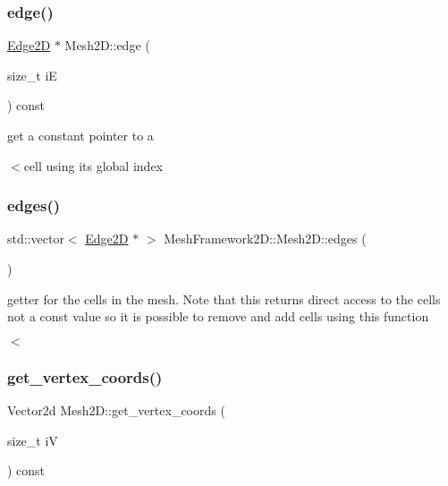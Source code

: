 \subsubsection{\texorpdfstring{edge()}{edge()}}
{\footnotesize\ttfamily \hyperlink{classMeshFramework2D_1_1Edge2D}{Edge2D} $\ast$ Mesh2\+D\+::edge (\begin{DoxyParamCaption}\item[{size\+\_\+t}]{iE }\end{DoxyParamCaption}) const}



get a constant pointer to a 

$<$cell using its global index \mbox{\label{classMeshFramework2D_1_1Mesh2D_a63b60ba84e079a7982b82b18ce5192f5}} 
\subsubsection{\texorpdfstring{edges()}{edges()}}
{\footnotesize\ttfamily std\+::vector$<$ \hyperlink{classMeshFramework2D_1_1Edge2D}{Edge2D} $\ast$ $>$ Mesh\+Framework2\+D\+::\+Mesh2\+D\+::edges (\begin{DoxyParamCaption}{ }\end{DoxyParamCaption})\hspace{0.3cm}{\ttfamily [inline]}}



getter for the cells in the mesh. Note that this returns direct access to the cells not a const value so it is possible to remove and add cells using this function 

$<$ \mbox{\label{classMeshFramework2D_1_1Mesh2D_a66b317b0a3cfba8a1935928db560957f}} 
\subsubsection{\texorpdfstring{get\+\_\+vertex\+\_\+coords()}{get\_vertex\_coords()}}
{\footnotesize\ttfamily Vector2d Mesh2\+D\+::get\+\_\+vertex\+\_\+coords (\begin{DoxyParamCaption}\item[{size\+\_\+t}]{iV }\end{DoxyParamCaption}) const}



